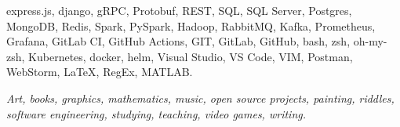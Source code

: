 \documentclass[10pt,a4paper]{article}
\begin{document}
\begin{customitemize}
\begin{customitemize}
{{                        express.js,
                        django,
                        gRPC,
                        Protobuf,
                        REST,
                        SQL,
                        SQL Server,
                        Postgres,
                        MongoDB,
                        Redis,
                        Spark,
                        PySpark,
                        Hadoop,
                        RabbitMQ,
                        Kafka,
                        Prometheus,
                        Grafana,
                        GitLab CI,
                        GitHub Actions,
                        GIT,
                        GitLab,
                        GitHub,
                        bash,
                        zsh,
                        oh-my-zsh,
                        Kubernetes,
                        docker,
                        helm,
                        Visual Studio,
                        VS Code,
                        VIM,
                        Postman,
                        WebStorm,
                        \LaTeX,
                        RegEx,
                        MATLAB.}
              }
    \end{customitemize}
    \item[] 
\end{customitemize}
\sectionrule{}

\begin{customitemize}
    \item[] 
    \begin{customitemize}
        \item {\textit{
                        Art,
                        books,
                        graphics,
                        mathematics,
                        music,
                        open source projects,
                        painting,
                        riddles,
                        software engineering,
                        studying,
                        teaching,
                        video games,
                        writing.
                    }}
    \end{customitemize}
\end{customitemize}
\end{document}
